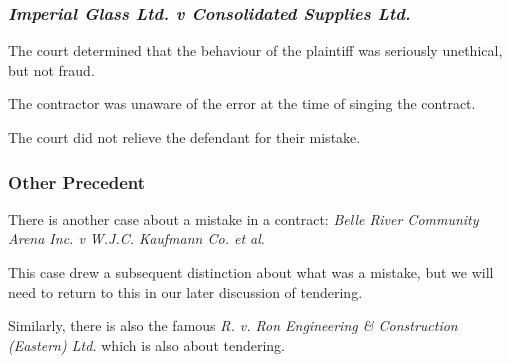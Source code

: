 \begin{frame}
\frametitle{\textit{Imperial Glass Ltd. v Consolidated Supplies Ltd.}}

The court determined that the behaviour of the plaintiff was seriously unethical, but not fraud.

The contractor was unaware of the error at the time of singing the contract.

The court did not relieve the defendant for their mistake.

\end{frame}



\begin{frame}
\frametitle{Other Precedent}

There is another case about a mistake in a contract:
\textit{Belle River Community Arena Inc. v W.J.C. Kaufmann Co. et al}.

This case drew a subsequent distinction about what was a mistake, but we will need to return to this in our later discussion of tendering.

Similarly, there is also the famous \textit{R. v. Ron Engineering \& Construction (Eastern) Ltd.} which is also about tendering.


\end{frame}





